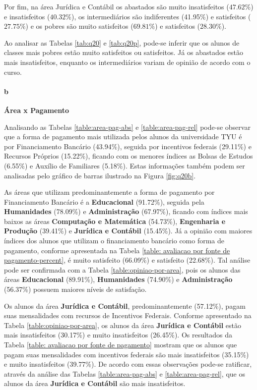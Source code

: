 \documentclass[10pt,a4paper,oneside]{article}
\newcommand{\jur}{Jurídica e Contábil\xspace}
\begin{document}
Por fim, na área \jur os abastados são muito insatisfeitos ($47.62\%$) e insatisfeitos ($40.32\%$), os intermediários são indiferentes (41.95\%) e satisfeitos ($27.75\%$) e os 
pobres são muito satisfeitos ($69.81\%$) e satisfeitos ($28.30\%$).

Ao analisar as Tabelas \ref{tab:q20} e \ref{tab:q20p}, pode-se inferir que os alunos de classes mais pobres estão muito satisfeitos ou satisfeitos. Já os abastados estão mais insatisfeitos, enquanto os 
intermediários variam de opinião de acordo com o curso.





\paragraph{b}{\textbf{Área x Pagamento}}

Analisando as Tabelas \ref{table:area-pag-abs} e \ref{table:area-pag-rel} pode-se observar que a forma de pagamento mais utilizada pelos alunos da universidade TYU é por Financiamento Bancário 
(43.94\%), seguida por incentivos federais (29.11\%) e Recursos Próprios (15.22\%), ficando com os menores índices as Bolsas de Estudos (6.55\%) e Auxílio de Familiares (5.18\%). Estas informações 
também podem ser analisadas pelo gráfico de barras ilustrado na Figura \ref{fig:q20b}.

As áreas que utilizam predominantemente a forma de pagamento por Financiamento Bancário é a \textbf{Educacional} (91.72\%), seguida pela \textbf{Humanidades} (78.09\%) e \textbf{Administração} 
(67.97\%), ficando com índices mais baixos as áreas \textbf{Computação e Matemática} (54.73\%), \textbf{Engenharia e Produção} (39.41\%) e \textbf{Jurídica e Contábil} (15.45\%). Já a opinião com 
maiores índices dos alunos que utilizam o financiamento bancário como forma de pagamento, conforme apresentada na Tabela \ref{table: avaliacao por fonte de pagamento-percent}, é muito satisfeito (66.09\%) e satisfeito (22.68\%). Tal análise pode ser confirmada com a Tabela 
\ref{table:opiniao-por-area}, pois os alunos das áreas \textbf{Educacional} (89.91\%), \textbf{Humanidades} (74.90\%) e \textbf{Administração} (56.37\%) possuem maiores níveis de satisfação.

Os alunos da área \textbf{Jurídica e Contábil}, predominantemente (57.12\%), pagam suas mensalidades com recursos de Incentivos Federais. Conforme apresentado na Tabela \ref{table:opiniao-por-area}, os alunos da área 
\textbf{Jurídica e Contábil} estão mais insatisfeitos (30.17\%) e muito insatisfeitos (26.45\%). Os resultados da Tabela \ref{table: avaliacao por fonte de pagamento} mostram que os alunos que pagam suas mensalidades com incentivos federais são 
mais insatisfeitos (35.15\%) e muito insatisfeitos (39.77\%). De acordo com essas observações pode-se ratificar, através da análise das Tabelas \ref{table:area-pag-abs} e \ref{table:area-pag-rel}, que 
os alunos da área \textbf{Jurídica e Contábil} são mais insatisfeitos.
\end{document}
